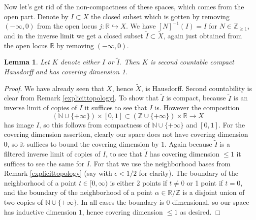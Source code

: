 \documentclass[12pt]{article}
\newtheorem{lemma}[theorem]{Lemma}
\begin{document}
Now let's get rid of the non-compactness of these spaces, which comes from the open part.  Denote by $I\subset X$
the closed subset which is gotten by removing $(-\infty,0)$ from the open locus $j:\mathbb{R}\hookrightarrow X$.  We have $[N]^{-1}(I)=I$ for $N\in\mathbb{Z}_{\geq 1}$, and in the inverse limit we get a closed subset $\widetilde{I}\subset\widetilde{X}$, again just obtained from the open locus $\mathbb{R}$ by removing $(-\infty,0)$.

\begin{lemma}
Let $K$ denote either $I$ or $\widetilde{I}$.  Then $K$ is second countable compact Hausdorff and has covering dimension 1.
\end{lemma}
\begin{proof}
We have already seen that $X$, hence $\widetilde{X}$, is Hausdorff.  Second countability is clear from Remark \ref{explicittopology}. To show that $\widetilde{I}$ is compact, because $\widetilde{I}$ is an inverse limit of copies of $I$ it suffices to see that $I$ is.  However the composition
$$(\mathbb{N}\cup\{+\infty\})\times[0,1]\subset (\mathbb{Z}\cup\{+\infty\})\times \mathbb{R}\rightarrow X$$
has image $I$, so this follows from compactness of $\mathbb{N}\cup\{+\infty\}$ and $[0,1]$.  For the covering dimension assertion, clearly our space does not have covering dimension $0$, so it suffices to bound the covering dimension by 1.  Again because $\widetilde{I}$ is a filtered inverse limit of copies of $I$, to see that $\widetilde{I}$ has covering dimension $\leq 1$ it suffices to see the same for $I$.  For that we use the neighborhood bases from Remark \ref{explicittopology} (say with $\epsilon<1/2$ for clarity).  The boundary of the neighborhood of a point $t\in [0,\infty)$ is either 2 points if $t\neq 0$ or 1 point if $t=0$, and the boundary of the neighborhood of a point $\alpha\in\mathbb{R}/\mathbb{Z}$ is a disjoint union of two copies of $\mathbb{N}\cup\{+\infty\}$.  In all cases the boundary is 0-dimensional, so our space has inductive dimension $1$, hence covering dimension $\leq 1$ as desired.
\end{proof}
\end{document}
